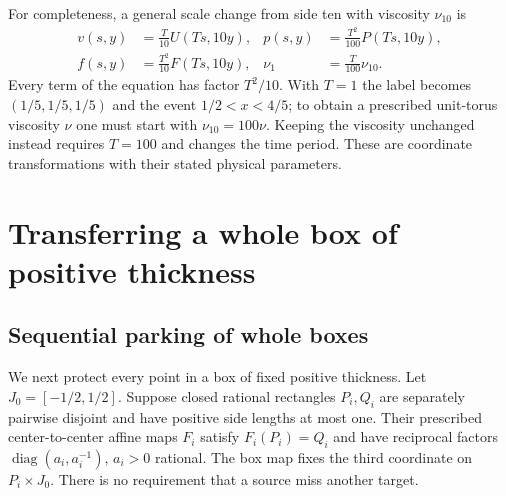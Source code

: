 For completeness, a general scale change from side ten with viscosity
$\nu_{10}$ is
\begin{equation}\label{sv:torus-rescale}
\begin{aligned}
 v(s,y)&=\frac T{10}U(Ts,10y),&
 p(s,y)&=\frac{T^2}{100}P(Ts,10y),\\
 f(s,y)&=\frac{T^2}{10}F(Ts,10y),&
 \nu_1&=\frac T{100}\nu_{10}.
\end{aligned}
\end{equation}
Every term of the equation has factor $T^2/10$.  With $T=1$ the
label becomes $(1/5,1/5,1/5)$ and the event $1/2<x<4/5$;
to obtain a prescribed unit-torus viscosity $\nu$ one must start
with $\nu_{10}=100\nu$.  Keeping the viscosity unchanged instead
requires $T=100$ and changes the time period.  These are coordinate
transformations with their stated physical parameters.

\section{Transferring a whole box of positive thickness}
\label{sv:routing}

\subsection{Sequential parking of whole boxes}
\label{sv:parking}
We next protect every point in a box of fixed positive thickness.
Let $J_0=[-1/2,1/2]$.  Suppose closed rational rectangles $P_i,Q_i$
are separately pairwise disjoint and have positive side lengths at most
one. Their prescribed center-to-center affine maps $F_i$ satisfy
$F_i(P_i)=Q_i$ and have reciprocal factors
$\operatorname{diag}(a_i,a_i^{-1})$, $a_i>0$ rational.
The box map fixes the third coordinate on $P_i\times J_0$.
There is no requirement that a source miss another target.

